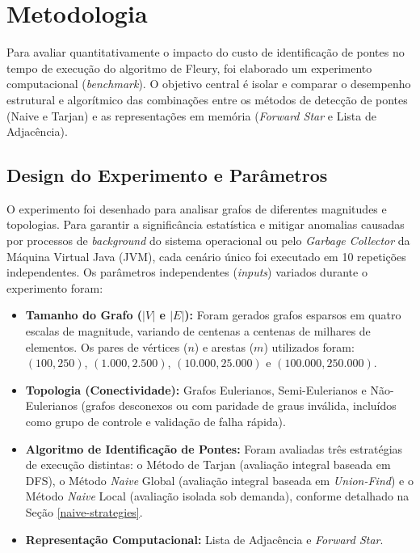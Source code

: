 \documentclass[12pt]{article}
\begin{document}
\section{Metodologia} \label{metodologia}

Para avaliar quantitativamente o impacto do custo de identificação de pontes no tempo de execução do algoritmo de Fleury, foi elaborado um experimento computacional (\textit{benchmark}). O objetivo central é isolar e comparar o desempenho estrutural e algorítmico das combinações entre os métodos de detecção de pontes (Naive e Tarjan) e as representações em memória (\textit{Forward Star} e Lista de Adjacência).

\subsection{Design do Experimento e Parâmetros}

O experimento foi desenhado para analisar grafos de diferentes magnitudes e topologias. Para garantir a significância estatística e mitigar anomalias causadas por processos de \textit{background} do sistema operacional ou pelo \textit{Garbage Collector} da Máquina Virtual Java (JVM), cada cenário único foi executado em 10 repetições independentes. Os parâmetros independentes (\textit{inputs}) variados durante o experimento foram:

\begin{itemize}
    \item \textbf{Tamanho do Grafo ($|V|$ e $|E|$):} Foram gerados grafos esparsos em quatro escalas de magnitude, variando de centenas a centenas de milhares de elementos. Os pares de vértices ($n$) e arestas ($m$) utilizados foram: $(100, 250)$, $(1.000, 2.500)$, $(10.000, 25.000)$ e $(100.000, 250.000)$.
    \item \textbf{Topologia (Conectividade):} Grafos Eulerianos, Semi-Eulerianos e Não-Eulerianos (grafos desconexos ou com paridade de graus inválida, incluídos como grupo de controle e validação de falha rápida).
    \item \textbf{Algoritmo de Identificação de Pontes:} Foram avaliadas três estratégias de execução distintas: o Método de Tarjan (avaliação integral baseada em DFS), o Método \textit{Naive} Global (avaliação integral baseada em \textit{Union-Find}) e o Método \textit{Naive} Local (avaliação isolada sob demanda), conforme detalhado na Seção \ref{naive-strategies}.
    \item \textbf{Representação Computacional:} Lista de Adjacência e \textit{Forward Star}.
\end{itemize}
\end{document}
